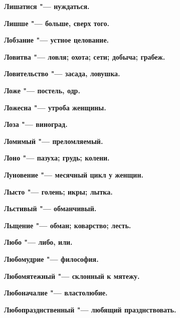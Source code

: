 \bfseries Лишатися \normalfont{} "--- нуждаться. 




\bfseries Лишше \normalfont{} "--- больше, сверх того. 




\bfseries Лобзание \normalfont{} "--- устное целование. 




\bfseries Ловитва \normalfont{} "--- ловля; охота; сети; добыча; грабеж. 




\bfseries Ловительство \normalfont{} "--- засада, ловушка. 




\bfseries Ложе \normalfont{} "--- постель, одр. 




\bfseries Ложесна \normalfont{} "--- утроба женщины. 




\bfseries Лоза \normalfont{} "--- виноград. 




\bfseries Ломимый \normalfont{} "--- преломляемый. 




\bfseries Лоно \normalfont{} "--- пазуха; грудь; колени. 




\bfseries Луновение \normalfont{} "--- месячный цикл у женщин. 




\bfseries Лысто \normalfont{} "--- голень; икры; лытка. 




\bfseries Льстивый \normalfont{} "--- обманчивый. 




\bfseries Льщение \normalfont{} "--- обман; коварство; лесть. 




\bfseries Любо \normalfont{} "--- либо, или. 




\bfseries Любомудрие \normalfont{} "--- философия. 




\bfseries Любомятежный \normalfont{} "--- склонный к мятежу. 




\bfseries Любоначалие \normalfont{} "--- властолюбие. 




\bfseries Любопразднственный \normalfont{} "--- любящий празднствовать. 




